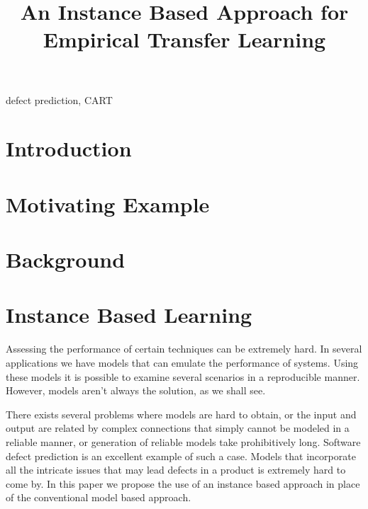 \documentclass[conference]{IEEEtran}
\begin{document}
  \title{An Instance Based Approach for Empirical Transfer Learning}
  
  \author{
    \and
    }
  
  \maketitle
  
  
  \begin{abstract}
 
  \end{abstract}
  \begin{IEEEkeywords}
    defect prediction, CART
  \end{IEEEkeywords}
  
\section{Introduction}
\section{Motivating Example}
\section{Background}
\section{Instance Based Learning}
Assessing the performance of certain techniques can be extremely hard. In several applications we have models that can emulate the performance of systems. Using these models it is possible to examine several scenarios in a reproducible manner. However, models aren't always the solution, as we shall see. 

There exists several problems where models are hard to obtain, or the input and output are related by complex connections that simply cannot be modeled in a reliable manner, or generation of reliable models take prohibitively long. Software defect prediction is an excellent example of such a case. Models that incorporate all the intricate issues that may lead defects in a product is extremely hard to come by. In this paper we propose the use of an instance based approach in place of the conventional model based approach.
\end{document}
